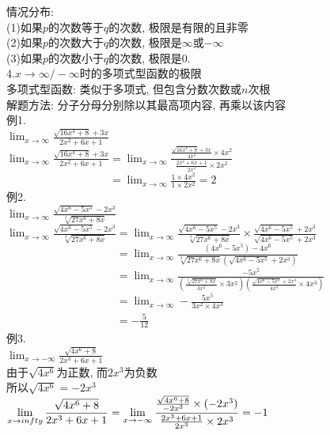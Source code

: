 情况分布:\\
(1)如果$p$的次数等于$q$的次数, 极限是有限的且非零\\
(2)如果$p$的次数大于$q$的次数, 极限是$\infty$或$-\infty$\\
(3)如果$p$的次数小于$q$的次数, 极限是0.\\[2ex]

4.$x\to\infty/-\infty$时的多项式型函数的极限\\
多项式型函数: 类似于多项式, 但包含分数次数或$n$次根\\
解题方法: 分子分母分别除以其最高项内容, 再乘以该内容\\
例1.\\
\phantom{例}$\displaystyle\lim_{x\to\infty}\frac{\sqrt{16x^4+8}+3x}{2x^2+6x+1}$\\
$\displaystyle\lim_{x\to\infty}\frac{\sqrt{16x^4+8}+3x}{2x^2+6x+1}=\lim_{x\to\infty}\frac{\frac{\sqrt{16x^4+8}+3x}{4x^2}\times4x^2}{\frac{2x^2+6x+1}{2x^2}\times2x^2}$\\
$\displaystyle\phantom{\lim_{x\to\infty}\frac{\sqrt{16x^4+8}+3x}{2x^2+6x+1}}=\lim_{x\to\infty}\frac{1\times4x^2}{1\times2x^2}=2$\\

例2.\\
\phantom{例}$\displaystyle\lim_{x\to\infty}\frac{\sqrt{4x^6-5x^5}-2x^3}{\sqrt[3]{27x^6+8x}}$\\
$\displaystyle\lim_{x\to\infty}\frac{\sqrt{4x^6-5x^5}-2x^3}{\sqrt[3]{27x^6+8x}}=\lim_{x\to\infty}\frac{\sqrt{4x^6-5x^5}-2x^3}{\sqrt[3]{27x^6+8x}}\times\frac{\sqrt{4x^6-5x^5}+2x^3}{\sqrt{4x^6-5x^5}+2x^3}$\\
$\displaystyle\phantom{\lim_{x\to\infty}\frac{\sqrt{4x^6-5x^5}-2x^3}{\sqrt[3]{27x^6+8x}}}=\lim_{x\to\infty}\frac{(4x^6-5x^5)-4x^6}{\sqrt[3]{27x^6+8x}(\sqrt{4x^6-5x^5}+2x^3)}$\\
$\displaystyle\phantom{\lim_{x\to\infty}\frac{\sqrt{4x^6-5x^5}-2x^3}{\sqrt[3]{27x^6+8x}}}=\lim_{x\to\infty}\frac{-5x^5}{(\frac{\sqrt[3]{27x^6+8x}}{3x^2}\times3x^2)(\frac{\sqrt{4x^6-5x^5}+2x^3}{4x^3}\times4x^3)}$\\
$\displaystyle\phantom{\lim_{x\to\infty}\frac{\sqrt{4x^6-5x^5}-2x^3}{\sqrt[3]{27x^6+8x}}}=\lim_{x\to\infty}-\frac{5x^5}{3x^2\times4x^3}$\\
$\displaystyle\phantom{\lim_{x\to\infty}\frac{\sqrt{4x^6-5x^5}-2x^3}{\sqrt[3]{27x^6+8x}}}=-\frac{5}{12}$\\

例3.\\
\phantom{例}$\displaystyle\lim_{x\to-\infty}\frac{\sqrt{4x^6+8}}{2x^3+6x+1}$\\
由于$\sqrt{4x^6}$为正数, 而$2x^3$为负数\\
所以$\sqrt{4x^6}=-2x^3$\\
$\displaystyle\lim_{x\to\-infty}\frac{\sqrt{4x^6+8}}{2x^3+6x+1}=\lim_{x\to-\infty}\frac{\frac{\sqrt{4x^6+8}}{-2x^3}\times(-2x^3)}{\frac{2x^3+6x+1}{2x^3}\times2x^3}=-1$\\

